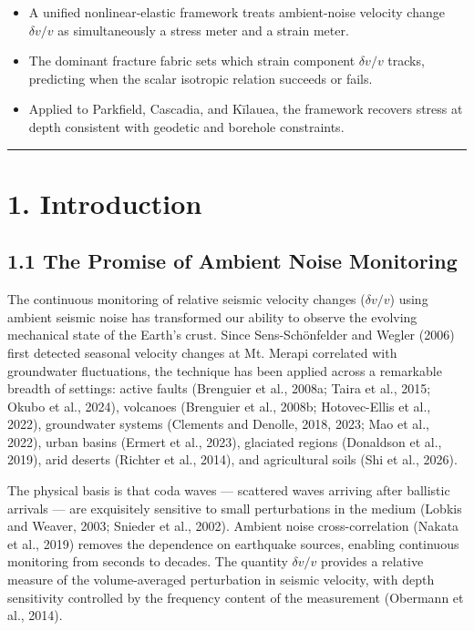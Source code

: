 \documentclass[12pt]{article}
\providecommand{\tightlist}{%
  \setlength{\itemsep}{0pt}\setlength{\parskip}{0pt}}
\begin{document}
\begin{itemize}
\tightlist
\item
  A unified nonlinear-elastic framework treats ambient-noise velocity
  change \(\delta v/v\) as simultaneously a stress meter and a strain
  meter.
\item
  The dominant fracture fabric sets which strain component
  \(\delta v/v\) tracks, predicting when the scalar isotropic relation
  succeeds or fails.
\item
  Applied to Parkfield, Cascadia, and Kīlauea, the framework recovers
  stress at depth consistent with geodetic and borehole constraints.
\end{itemize}

\begin{center}\rule{0.5\linewidth}{0.5pt}\end{center}

\section{1. Introduction}\label{introduction}

\subsection{1.1 The Promise of Ambient Noise
Monitoring}\label{the-promise-of-ambient-noise-monitoring}

The continuous monitoring of relative seismic velocity changes
(\(\delta v/v\)) using ambient seismic noise has transformed our ability
to observe the evolving mechanical state of the Earth's crust. Since
Sens-Schönfelder and Wegler (2006) first detected seasonal velocity
changes at Mt. Merapi correlated with groundwater fluctuations, the
technique has been applied across a remarkable breadth of settings:
active faults (Brenguier et al., 2008a; Taira et al., 2015; Okubo et
al., 2024), volcanoes (Brenguier et al., 2008b; Hotovec-Ellis et al.,
2022), groundwater systems (Clements and Denolle, 2018, 2023; Mao et
al., 2022), urban basins (Ermert et al., 2023), glaciated regions
(Donaldson et al., 2019), arid deserts (Richter et al., 2014), and
agricultural soils (Shi et al., 2026).

The physical basis is that coda waves --- scattered waves arriving after
ballistic arrivals --- are exquisitely sensitive to small perturbations
in the medium (Lobkis and Weaver, 2003; Snieder et al., 2002). Ambient
noise cross-correlation (Nakata et al., 2019) removes the dependence on
earthquake sources, enabling continuous monitoring from seconds to
decades. The quantity \(\delta v/v\) provides a relative measure of the
volume-averaged perturbation in seismic velocity, with depth sensitivity
controlled by the frequency content of the measurement (Obermann et al.,
2014).
\end{document}
